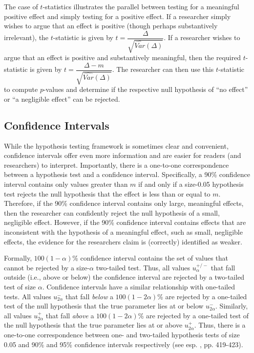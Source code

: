 \documentclass[12pt]{article}
\begin{document}
The case of $t$-statistics illustrates the parallel between testing for a meaningful positive effect and simply testing for a positive effect. If a researcher simply wishes to argue that an effect is positive (though perhaps substantively irrelevant), the $t$-statistic is given by $t = \dfrac{\Delta}{\sqrt{\widehat{Var}(\Delta)}}$. If a researcher wishes to argue that an effect is positive and substantively meaningful, then the required $t$-statistic is given by $t = \dfrac{\Delta - m}{\sqrt{\widehat{Var}(\Delta)}}$. The researcher can then use this $t$-statistic to compute $p$-values and determine if the respective null hypothesis of ``no effect'' or ``a negligible effect'' can be rejected.

\subsection*{Confidence Intervals}

While the hypothesis testing framework is sometimes clear and convenient, confidence intervals offer even more information and are easier for readers (and researchers) to interpret. Importantly, there is a one-to-one correspondence between a hypothesis test and a confidence interval. Specifically, a 90\% confidence interval contains only values greater than $m$ if and only if a size-0.05 hypothesis test rejects the null hypothesis that the effect is less than or equal to $m$. Therefore, if the 90\% confidence interval contains only large, meaningful effects, then the researcher can confidently reject the null hypothesis of a small, negligible effect. However, if the 90\% confidence interval contains effects that are inconsistent with the hypothesis of a meaningful effect, such as small, negligible effects, the evidence for the researchers claim is (correctly) identified as weaker. 

Formally, $100(1-\alpha)$\% confidence interval contains the set of values that cannot be rejected by a size-$\alpha$ two-tailed test. Thus, all values $u^{+/-}_{\alpha}$ that fall outside (i.e., above or below) the confidence interval are rejected by a two-tailed test of size $\alpha$. Confidence intervals have a similar relationship with one-tailed tests. All values $u^{-}_{2\alpha}$ that fall \textit{below} a $100(1-2\alpha)$\% are rejected by a one-tailed test of the null hypothesis that the true parameter lies at or below $u^{-}_{2\alpha}$. Similarly, all values $u^{+}_{2\alpha}$ that fall \textit{above} a $100(1-2\alpha)$\% are rejected by a one-tailed test of the null hypothesis that the true parameter lies at or above $u^{+}_{2\alpha}$. Thus, there is a one-to-one correspondence between one- and two-tailed hypothesis tests of size 0.05 and 90\% and 95\% confidence intervals respectively (see esp. \citealt{CasellaBerger2002}, pp. 419-423).
\end{document}

